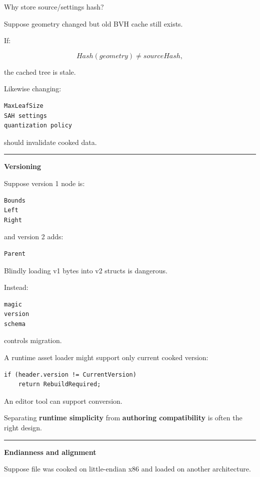 Why store source/settings hash?

Suppose geometry changed but old BVH cache still exists.

If:

\[
Hash(geometry)\ne sourceHash,
\]

the cached tree is stale.

Likewise changing:

\begin{verbatim}
MaxLeafSize
SAH settings
quantization policy
\end{verbatim}

should invalidate cooked data.

\begin{center}\rule{0.5\linewidth}{0.5pt}\end{center}

\textbf{Versioning}

Suppose version 1 node is:

\begin{verbatim}
Bounds
Left
Right
\end{verbatim}

and version 2 adds:

\begin{verbatim}
Parent
\end{verbatim}

Blindly loading v1 bytes into v2 structs is dangerous.

Instead:

\begin{verbatim}
magic
version
schema
\end{verbatim}

controls migration.

A runtime asset loader might support only current cooked version:

\begin{verbatim}
if (header.version != CurrentVersion)
    return RebuildRequired;
\end{verbatim}

An editor tool can support conversion.

Separating \textbf{runtime simplicity} from \textbf{authoring compatibility} is often the right design.

\begin{center}\rule{0.5\linewidth}{0.5pt}\end{center}

\textbf{Endianness and alignment}

Suppose file was cooked on little-endian x86 and loaded on another architecture.

